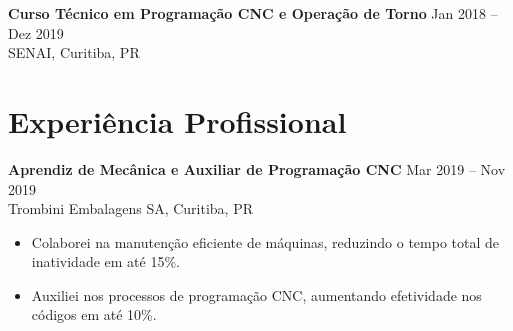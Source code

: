 \documentclass[a4paper, 10pt]{article}
\begin{document}
\medskip
\textbf{Curso Técnico em Programação CNC e Operação de Torno} \hfill Jan 2018 -- Dez 2019 \\
SENAI, Curitiba, PR

\section{Experiência Profissional}
\textbf{Aprendiz de Mecânica e Auxiliar de Programação CNC} \hfill Mar 2019 -- Nov 2019 \\
Trombini Embalagens SA, Curitiba, PR
\begin{itemize}
    \item Colaborei na manutenção eficiente de máquinas, reduzindo o tempo total de inatividade em até 15\%.
    \item Auxiliei nos processos de programação CNC, aumentando efetividade nos códigos em até 10\%.
\end{itemize}
\end{document}
